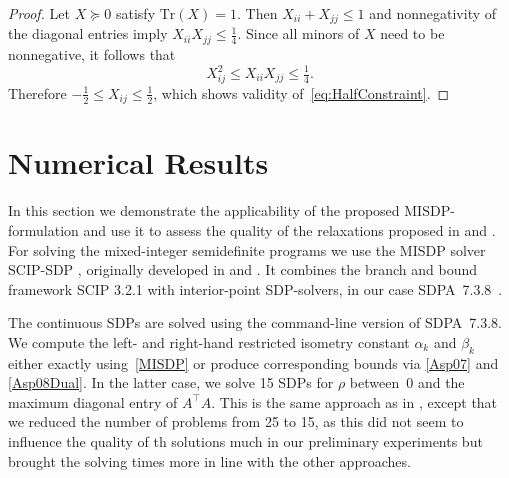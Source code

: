 \documentclass[journal]{IEEEtran}
\newcommand{\T}{^{\top}}
\newcommand{\Tr}{\text{Tr}}
\begin{document}
\begin{proof}
  Let $X \succeq 0$ satisfy $\Tr(X)=1$. Then $X_{ii}+X_{jj}\leq 1$ and
  nonnegativity of the diagonal entries imply $X_{ii}X_{jj}\leq
  \tfrac{1}{4}$.  Since all minors of $X$ need to be nonnegative, it
  follows that
  \begin{equation*}
    X_{ij}^2 \leq  X_{ii} X_{jj} \leq \tfrac{1}{4}.
  \end{equation*}
  Therefore $- \tfrac{1}{2} \leq X_{ij} \leq \tfrac{1}{2}$, which shows
  validity of~\eqref{eq:HalfConstraint}.
\end{proof}


\section{Numerical Results}
\label{sec:numerical_results}

\noindent
In this section we demonstrate the applicability of the proposed MISDP-formulation and use it to
assess the quality of the relaxations proposed in \cite{Asp08} and \cite{Asp07}.
For solving the mixed-integer semidefinite programs we use the MISDP solver SCIP-SDP \cite{SCIP-SDP},
originally developed in \cite{Mar13} and \cite{MS12}. It combines the
branch and bound framework SCIP 3.2.1 \cite{SCIP} with 
interior-point SDP-solvers, in our case SDPA~7.3.8~\cite{SDPA6,SDPA7}.

The continuous SDPs are solved using the command-line version of
SDPA~7.3.8. We compute the left- and right-hand restricted isometry
constant $\alpha_k$ and $\beta_k$ either exactly using~\eqref{MISDP} or
produce corresponding bounds via \eqref{Asp07} and \eqref{Asp08Dual}. In
the latter case, we solve 15 SDPs for $\rho$ between~$0$ and the maximum
diagonal entry of $A\T A$. This is the same approach as in \cite{Asp08},
except that we reduced the number of problems from 25 to 15, as this did
not seem to influence the quality of th solutions much in our preliminary
experiments but brought the solving times more in line with the other
approaches.
\end{document}
